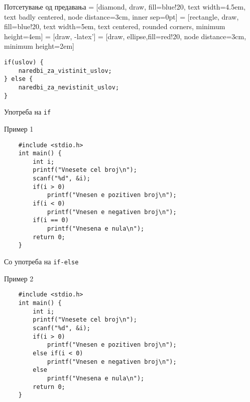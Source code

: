

\begin{frame}[fragile]{Потсетување од предавања}
 = [diamond, draw, fill=blue!20, 
    text width=4.5em, text badly centered, node distance=3cm, inner sep=0pt]
 = [rectangle, draw, fill=blue!20, 
    text width=5em, text centered, rounded corners, minimum height=4em]
 = [draw, -latex']
 = [draw, ellipse,fill=red!20, node distance=3cm,
    minimum height=2em]
    
\begin{center}
\begin{lstlisting}
if(uslov) {
    naredbi_za_vistinit_uslov;
} else {
    naredbi_za_nevistinit_uslov;
}
\end{lstlisting}
\end{center}
\end{frame}

\begin{frame}[fragile]{Употреба на \texttt{if}}
	\begin{exampleblock}{Пример 1}
	\begin{lstlisting}
	#include <stdio.h> 
	int main() { 
	    int i;
	    printf("Vnesete cel broj\n");
	    scanf("%d", &i);
	    if(i > 0) 
	        printf("Vnesen e pozitiven broj\n");
	    if(i < 0)
	        printf("Vnesen e negativen broj\n"); 
	    if(i == 0)
	        printf("Vnesena e nula\n"); 
	    return 0; 
	}
	\end{lstlisting}
	\end{exampleblock}
\end{frame}

\begin{frame}[fragile]{Со употреба на \texttt{if-else}}

	\begin{exampleblock}{Пример 2}
	\begin{lstlisting}
	#include <stdio.h>
	int main() {
	    int i;
	    printf("Vnesete cel broj\n");
	    scanf("%d", &i); 
	    if(i > 0)
	        printf("Vnesen e pozitiven broj\n");
	    else if(i < 0)
	        printf("Vnesen e negativen broj\n"); 
	    else
	        printf("Vnesena e nula\n"); 
	    return 0; 
	}
	\end{lstlisting}
	\end{exampleblock}

\end{frame}

